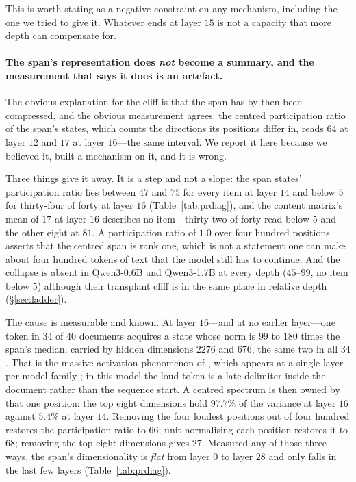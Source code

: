 \documentclass{article}
\begin{document}
This is worth stating as a negative constraint on any mechanism, including the
one we tried to give it. Whatever ends at layer $15$ is not a capacity that more
depth can compensate for.

\paragraph{The span's representation does \emph{not} become a summary, and the
measurement that says it does is an artefact.} The obvious explanation for the
cliff is that the span has by then been compressed, and the obvious measurement
agrees: the centred participation ratio of the span's states, which counts the
directions its positions differ in, reads $64$ at layer $12$ and $17$ at layer
$16$---the same interval. We report it here because we believed it, built a
mechanism on it, and it is wrong.

Three things give it away. It is a step and not a slope: the span states'
participation ratio lies between $47$ and $75$ for every item at layer $14$ and
below $5$ for thirty-four of forty at layer $16$ (Table~\ref{tab:prdiag}), and
the content matrix's mean of $17$ at layer $16$ describes no item---thirty-two
of forty read below $5$ and the other eight at $81$. A participation ratio of
$1.0$ over four hundred positions asserts that the centred span is rank one,
which is not a statement one can make about four hundred tokens of text that
the model still has to continue. And the collapse is absent in Qwen3-0.6B and
Qwen3-1.7B at every depth ($45$--$99$, no item below $5$) although their
transplant cliff is in the same place in relative depth
(\S\ref{sec:ladder}).

The cause is measurable and known. At layer $16$---and at no earlier layer---one
token in $34$ of $40$ documents acquires a state whose norm is $99$ to $180$ times the
span's median, carried by hidden dimensions $2276$ and $676$, the same two in
all $34$. That is the massive-activation phenomenon of
\citet{sun2024massive}, which appears at a single layer per model family
\citep{shi2026melayer}; in this model the loud token is a late delimiter inside
the document rather than the sequence start. A centred spectrum is then owned by
that one position: the top eight dimensions hold $97.7\%$ of the variance at
layer $16$ against $5.4\%$ at layer $14$. Removing the four loudest positions
out of four hundred restores the participation ratio to $66$; unit-normalising
each position restores it to $68$; removing the top eight dimensions gives $27$.
Measured any of those three ways, the span's dimensionality is
\emph{flat} from layer $0$ to layer $28$ and only falls in the last few layers
(Table~\ref{tab:prdiag}).
\end{document}

